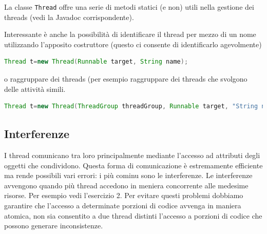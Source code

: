 \documentclass{article}
\begin{document}
La classe \texttt{Thread} offre una serie di metodi statici (e non) utili nella gestione dei threads (vedi la Javadoc corrispondente).

Interessante \`e anche la possibilit\`a di identificare il thread per mezzo di un nome utilizzando l'apposito costruttore (questo ci consente di identificarlo agevolmente)
\begin{lstlisting}[language=Java]
Thread t=new Thread(Runnable target, String name);
\end{lstlisting}

 o raggruppare dei threads (per esempio raggruppare dei threads che svolgono delle attivit\`a simili.
 \begin{lstlisting}[language=Java]
Thread t=new Thread(ThreadGroup threadGroup, Runnable target, "String name);
\end{lstlisting}





\subsection{Interferenze}
I thread comunicano tra loro principalmente mediante l'accesso ad attributi degli oggetti che condividono. Questa forma di comunicazione \`e estremamente efficiente ma rende possibili vari errori: i pi\`u cominu sono le interferenze. Le interferenze avvengono quando pi\`u thread accedono in meniera concorrente alle medesime risorse. Per esempio vedi l'esercizio 2. Per evitare questi problemi dobbiamo garantire che l'accesso a determinate porzioni di codice avvenga in maniera atomica, non sia consentito a due thread distinti l'accesso a porzioni di codice che possono generare inconsistenze.
\end{document}
